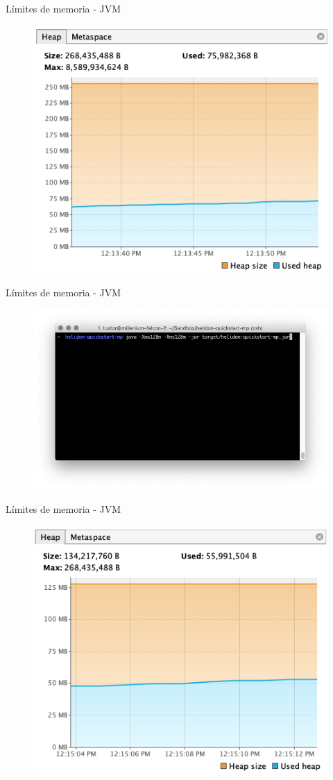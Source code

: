 \documentclass[aspectratio=169]{beamer}
\begin{document}
\begin{frame}{Límites de memoria - JVM}
    \begin{figure}
        \centering
        \includegraphics[width=0.6\linewidth]{Images/jvmnolimit.png}
        \label{fig:container2}
    \end{figure}
\end{frame}

\begin{frame}{Límites de memoria - JVM}
    \begin{figure}
        \centering
        \includegraphics[width=0.9\linewidth]{Images/helidonmem.png}
        \label{fig:container3}
    \end{figure}
\end{frame}

\begin{frame}{Límites de memoria - JVM}
    \begin{figure}
        \centering
        \includegraphics[width=0.6\linewidth]{Images/jvmlimit.png}
        \label{fig:container4}
    \end{figure}
\end{frame}
\end{document}
